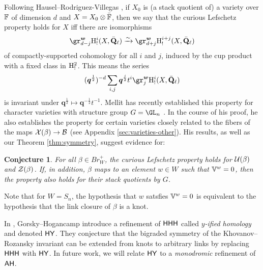 \documentclass[a4paper,10pt,leqno]{amsart}
\theoremstyle{plain}
\theoremstyle{plain}
\theoremstyle{plain}
\newtheorem{conj}[mainthm]{Conjecture}
\theoremstyle{definition}
\theoremstyle{remark}
\newcommand{\Br}{\mathit{Br}}
\newcommand{\Q}{\bm{q}}
\newcommand{\QL}{\bar{\mathbf{Q}}_\ell}
\begin{document}
Following Hausel--Rodriguez-Villegas \cite{hr}, if $X_0$ is (a stack quotient of) a variety over $\bb{F}$ of dimension $d$ and $X = X_0 \otimes \bar{\bb{F}}$, then we say that the curious Lefschetz property holds for $X$ iff there are isomorphisms
\begin{align}
\gr_{d - j}^{\bm{w}} \ur{H}_!^i(X, \QL)
\xrightarrow{\sim}
\gr_{d + j}^{\bm{w}} \ur{H}_!^{i + j}(X, \QL)
\end{align}
of compactly-supported cohomology for all $i$ and $j$, induced by the cup product with a fixed class in $\ur{H}_!^2$.
This means the series
\begin{align}
(\Q^{\frac{1}{2}})^{-d} \sum_{i, j}
	\Q^{\frac{j}{2}} t^i
	\gr_j^{\bm{w}} \ur{H}_!^i(X, \QL)
\end{align}
is invariant under $\Q^{\frac{1}{2}} \mapsto \Q^{-\frac{1}{2}} t^{-1}$.
Mellit has recently established this property for character varieties with structure group $G = \GL_n$ \cite{mellit}.
In the course of his proof, he also establishes the property for certain varieties closely related to the fibers of the maps $\cal{X}(\beta) \to \cal{B}$ (see Appendix \ref{sec:varieties-other}).
His results, as well as our Theorem \ref{thm:symmetry}, suggest evidence for:

\begin{conj}
For all $\beta \in \Br_W^+$, the curious Lefschetz property holds for $\cal{U}(\beta)$ and $\cal{Z}(\beta)$.
If, in addition, $\beta$ maps to an element $w \in W$ such that $\bb{V}^w = 0$, then the property also holds for their stack quotients by $G$.
\end{conj}

Note that for $W = S_n$, the hypothesis that $w$ satsfies $\bb{V}^w = 0$ is equivalent to the hypothesis that the link closure of $\beta$ is a knot.

In \cite{gh_2017}, Gorsky--Hogancamp introduce a refinement of $\sf{HHH}$ called \emph{$y$-ified homology} and denoted $\sf{HY}$.
They conjecture that the bigraded symmetry of the Khovanov--Rozansky invariant can be extended from knots to arbitrary links by replacing $\sf{HHH}$ with $\sf{HY}$.
In future work, we will relate $\sf{HY}$ to a \emph{monodromic} refinement of $\sf{AH}$.
\end{document}
